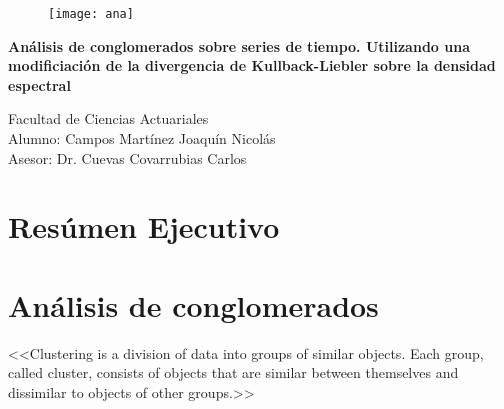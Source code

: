 \documentclass[12pt,oneside]{book}
\begin{document}
\begin{titlepage}
\vspace{3cm}
\begin{figure}[ht!]
\centering
\texttt{[image: ana]}
\end{figure}
\hspace{.6\textwidth}
\vspace{2cm}

\begin{center}
{\LARGE \textbf{An\'alisis de conglomerados sobre series de tiempo. Utilizando una modificiaci\'on de la divergencia de Kullback-Liebler sobre la densidad espectral}}\break
	\vspace{2cm} 

		{\Large Facultad de Ciencias Actuariales}\\
		{\Large Alumno: Campos Mart\'inez Joaqu\'in Nicol\'as}\\
		{\Large Asesor: Dr. Cuevas Covarrubias Carlos}
		\end{center}

		\end{titlepage}
\tableofcontents %
\setcounter{page}{0}
\chapter*{Res\'umen Ejecutivo} 
\setcounter{page}{0}
\chapter{An\'alisis de conglomerados} 
<<Clustering is a division of data into groups of similar objects. Each group, called cluster, consists of objects that are similar between themselves and dissimilar to objects of other groups.>>~\cite{DefClust}
\end{document}
